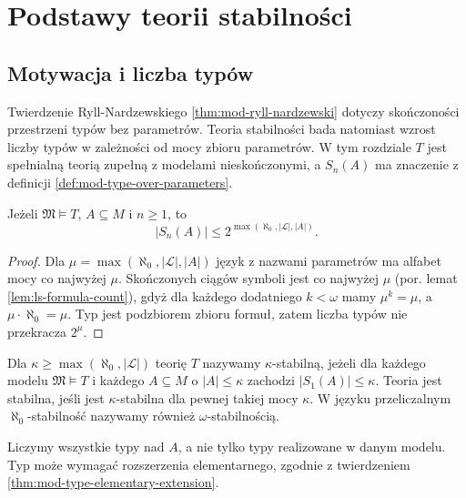 \chapter{Podstawy teorii stabilności}
\label{ch:mod-stability}

\section{Motywacja i liczba typów}

Twierdzenie Ryll-Nardzewskiego
\ref{thm:mod-ryll-nardzewski} dotyczy skończoności
przestrzeni typów bez parametrów. Teoria stabilności
bada natomiast wzrost liczby typów w zależności
od mocy zbioru parametrów. W tym rozdziale
$T$ jest spełnialną teorią zupełną z modelami
nieskończonymi, a $S_n(A)$ ma znaczenie
z definicji \ref{def:mod-type-over-parameters}.

\begin{lemat}
\label{lem:mod-stability-type-bound}
Jeżeli $\mathfrak M\models T$, $A\subseteq M$
i $n\geq1$, to
\[
|S_n(A)|\leq 2^{\max(\aleph_0,|\mathcal L|,|A|)}.
\]
\end{lemat}
\begin{proof}
Dla $\mu=\max(\aleph_0,|\mathcal L|,|A|)$ język
z nazwami parametrów ma alfabet mocy co najwyżej
$\mu$. Skończonych ciągów symboli jest co najwyżej
$\mu$ (por. lemat \ref{lem:ls-formula-count}),
gdyż dla każdego dodatniego $k<\omega$ mamy
$\mu^k=\mu$, a $\mu\cdot\aleph_0=\mu$.
Typ jest podzbiorem zbioru formuł, zatem liczba
typów nie przekracza $2^\mu$.
\end{proof}

\begin{definicja}
\label{def:mod-kappa-stability}
Dla $\kappa\geq\max(\aleph_0,|\mathcal L|)$ teorię
$T$ nazywamy $\kappa$-stabilną, jeżeli dla każdego
modelu $\mathfrak M\models T$ i każdego $A\subseteq M$
o $|A|\leq\kappa$ zachodzi $|S_1(A)|\leq\kappa$.
Teoria jest stabilna, jeśli jest $\kappa$-stabilna
dla pewnej takiej mocy $\kappa$.
W języku przeliczalnym $\aleph_0$-stabilność
nazywamy również $\omega$-stabilnością.
\end{definicja}

Liczymy wszystkie typy nad $A$, a nie tylko typy
realizowane w danym modelu. Typ może wymagać
rozszerzenia elementarnego, zgodnie z twierdzeniem
\ref{thm:mod-type-elementary-extension}.

